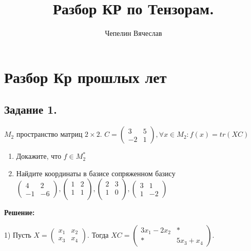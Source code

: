\documentclass{article}
\title{Разбор КР по Тензорам.}
\author{Чепелин Вячеслав}
\date{}
\begin{document}
\maketitle
\tableofcontents
\newpage

\section{Разбор Кр прошлых лет}

\subsection{Задание 1.}

$M_2$ пространство матриц $2\times 2$. $C= \begin{pmatrix}
    3 & 5\\
    -2 & 1
\end{pmatrix}, \forall x \in M_2: f(x) = tr (XC)$

\begin{enumerate}
    \item Докажите, что $f\in M_2^*$
    \item Найдите координаты в базисе сопряженном базису $\begin{pmatrix}
        4 & 2 \\
        -1 & -6
    \end{pmatrix}, \begin{pmatrix}
        1 & 2 \\
        1 & 1 \\
    \end{pmatrix}, \begin{pmatrix}
        2 & 3\\
        1 & 0 \\
    \end{pmatrix}, \begin{pmatrix}
        3 & 1 \\
        1 &  -2
    \end{pmatrix}$
\end{enumerate}

\textbf{Решение:}

1) Пусть $X = \begin{pmatrix}
    x_{1} & x_{2}\\
    x_{3} & x_{4}
\end{pmatrix}$. Тогда $XC = \begin{pmatrix}
    3x_1 -2x_2 & * \\
    * & 5x_3 + x_4
\end{pmatrix}$. 
\end{document}
